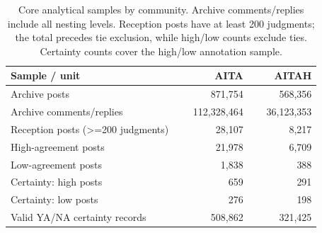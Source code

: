 \begin{table}[H]
\centering
\small
\setlength{\tabcolsep}{3pt}
\begin{minipage}[t]{0.49\textwidth}
\centering
\begin{tabular}{@{}p{0.54\linewidth}rr@{}}
\toprule
Sample / unit & AITA & AITAH \\
\midrule
Archive posts & 871,754 & 568,356 \\
Archive comments/replies & 112,328,464 & 36,123,353 \\
\midrule
Reception posts (>=200 judgments) & 28,107 & 8,217 \\
High-agreement posts & 21,978 & 6,709 \\
Low-agreement posts & 1,838 & 388 \\
\midrule
Certainty: high posts              & 659     & 291     \\
Certainty: low posts               & 276     & 198     \\
Valid YA/NA certainty records      & 508,862 & 321,425 \\
\bottomrule
\end{tabular}
\end{minipage}
\caption{Core analytical samples by community. Archive comments/replies
include all nesting levels. Reception posts have at least 200 judgments;
the total precedes tie exclusion, while high/low counts exclude ties.
Certainty counts cover the high/low annotation sample.}
\label{tab:analytical-samples}
\end{table}
